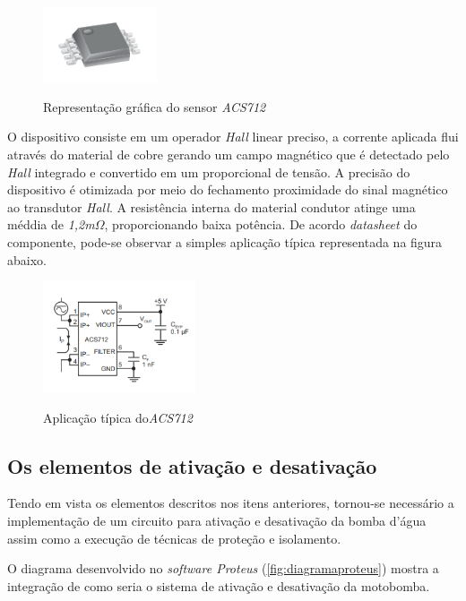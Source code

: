 \begin{figure}[H]
	\centering
	\caption{Representação gráfica do sensor \textit{ACS712}}
	\includegraphics[width=0.3\textwidth]{figuras/ACS712.png}
	\label{fig:acs712}
\end{figure} 


O dispositivo consiste em um operador \textit{Hall} linear preciso, a corrente aplicada flui através do material de cobre gerando um campo magnético que é detectado pelo \textit{Hall} integrado e convertido em um proporcional de tensão. A precisão do dispositivo é otimizada por meio do fechamento proximidade do sinal magnético ao transdutor \textit{Hall}. A resistência interna do material condutor atinge uma méddia de \textit{1,2m}$\Omega$, proporcionando baixa potência. De acordo \textit{datasheet} do componente, pode-se observar a simples aplicação típica representada na figura abaixo.
 
\begin{figure}[H]
	\centering
	\caption{Aplicação típica do\textit{ACS712}}
	\includegraphics[width=0.4\textwidth]{figuras/ACS712_typical.png}
	\label{fig:acs712_typical}
\end{figure} 

\subsection{Os elementos de ativação e desativação}

Tendo em vista os elementos descritos nos itens anteriores, tornou-se necessário a implementação de um circuito para ativação e desativação da bomba d'água assim como a execução de técnicas de proteção e isolamento.

O diagrama desenvolvido no \textit{software Proteus} (\autoref{fig:diagramaproteus}) mostra a integração de como seria o sistema de ativação e desativação da motobomba.

